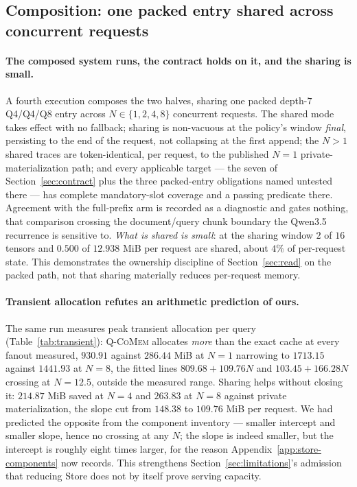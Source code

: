 \documentclass{article}
\newcommand{\qcomem}{\textsc{Q-CoMem}}
\begin{document}


\subsection{Composition: one packed entry shared across concurrent requests}
\label{sec:composition}

\paragraph{The composed system runs, the contract holds on it, and the sharing
is small.}
A fourth execution composes the two halves, sharing one packed depth-$7$
Q4/Q4/Q8 entry across $N\in\{1,2,4,8\}$ concurrent requests.  The shared mode
takes effect with no fallback; sharing is non-vacuous at
the policy's window \emph{final}, persisting to the end of the request, not
collapsing at the first append; the $N>1$ shared traces are
token-identical, per request, to the published $N=1$ private-materialization
path; and every applicable target --- the seven of Section~\ref{sec:contract}
plus the three packed-entry obligations named untested there --- has complete
mandatory-slot coverage and a passing predicate there.  Agreement with
the full-prefix arm is recorded as a diagnostic and gates nothing, that
comparison crossing the document/query chunk boundary the Qwen3.5 recurrence is
sensitive to.  \emph{What is shared is small}: at the sharing
window $2$ of $16$ tensors and $0.500$ of $12.938$ MiB per request are shared,
about $4\%$ of per-request state.  This demonstrates the ownership discipline of
Section~\ref{sec:read} on the packed path, not that sharing materially reduces
per-request memory.

\paragraph{Transient allocation refutes an arithmetic prediction of ours.}
The same run measures peak transient allocation per query
(Table~\ref{tab:transient}): \qcomem{} allocates \emph{more} than the exact cache
at every fanout measured, $930.91$ against $286.44$ MiB at $N=1$ narrowing to
$1713.15$ against $1441.93$ at $N=8$, the fitted lines $809.68+109.76N$ and
$103.45+166.28N$ crossing at $N=12.5$, outside the measured range.  Sharing helps
without closing it: $214.87$ MiB saved at $N=4$ and $263.83$ at $N=8$ against
private materialization, the slope cut from $148.38$ to $109.76$ MiB per
request.  We had predicted the opposite from the component inventory ---
smaller intercept and smaller slope, hence no crossing at any $N$; the slope is
indeed smaller, but the intercept is roughly eight times larger, for the reason
Appendix~\ref{app:store-components} now records.  This strengthens
Section~\ref{sec:limitations}'s admission that reducing Store does not by itself
prove serving capacity.
\end{document}
